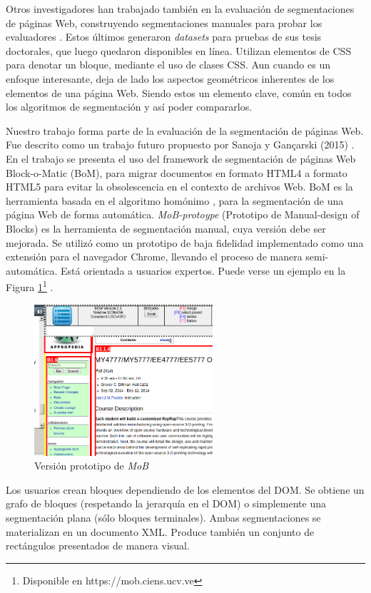 \documentclass[10pt]{revecom}
\begin{document}
Otros investigadores han trabajado también en la evaluación de segmentaciones de páginas Web, construyendo segmentaciones manuales para probar los evaluadores \cite{bjdmnmd2019,krh2015}. 
Estos últimos generaron \textit{datasets} para pruebas de sus tesis doctorales, que luego quedaron disponibles en línea. Utilizan elementos de CSS para denotar un bloque, mediante el uso de clases CSS.
Aun cuando es un enfoque interesante, deja de lado los aspectos geométricos inherentes de los elementos de una página Web. Siendo estos un elemento clave, común en todos los algoritmos de segmentación y así poder compararlos. 

Nuestro trabajo forma parte de la evaluación de la segmentación de páginas Web. 
Fue descrito como un trabajo futuro propuesto por Sanoja y Gançarski (2015) \cite{Sanoja:LIP6:2015,SanGan:SAC:2015}.
%
En el trabajo se presenta el uso del framework de segmentación de páginas Web Block-o-Matic (BoM), para migrar documentos en formato HTML4 a formato HTML5 para evitar la obsolescencia en el contexto de archivos Web.
%
BoM es la herramienta basada en el algoritmo homónimo \cite{Sanoja:ICMCS:2014}, para la segmentación de una página Web de forma automática. 
\emph{MoB-protoype} (Prototipo de Manual-design of Blocks) es la herramienta de segmentación manual, cuya versión debe ser mejorada.
Se utilizó como un prototipo de baja fidelidad implementado como una extensión para el navegador Chrome, llevando el proceso de manera semi-automática. 
Está orientada a usuarios expertos. Puede verse un ejemplo en la Figura \ref{fig1}\footnote{Disponible en https://mob.ciens.ucv.ve} .

\begin{figure}[htbp]
\centerline{\includegraphics[width=250px]{old-mob.png}}
\caption{Versión prototipo de  \emph{MoB}}
\label{fig1}
\end{figure}

Los usuarios crean bloques dependiendo de los elementos del DOM. 
Se obtiene un grafo de bloques (respetando la jerarquía en el DOM) o simplemente una segmentación plana (sólo bloques terminales). 
Ambas segmentaciones se materializan en un documento XML. 
Produce también un conjunto de rectángulos presentados de manera visual.
\end{document}

